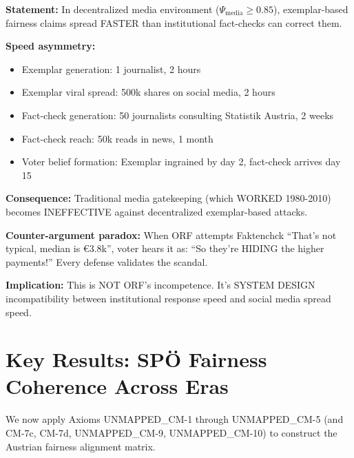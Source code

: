 \vspace{0.5em}

\begin{tcolorbox}[colback=gray!5!white, colframe=gray!75!black,
    title=Axiom UNMAPPED_CM-10: Institutional Lag and Media Gatekeeping Collapse]

\textbf{Statement:} In decentralized media environment ($\Psi_{\text{media}} \geq 0.85$),
exemplar-based fairness claims spread FASTER than institutional fact-checks can correct them.

\textbf{Speed asymmetry:}
\begin{itemize}[nosep]
\item Exemplar generation: 1 journalist, 2 hours
\item Exemplar viral spread: 500k shares on social media, 2 hours
\item Fact-check generation: 50 journalists consulting Statistik Austria, 2 weeks
\item Fact-check reach: 50k reads in news, 1 month
\item Voter belief formation: Exemplar ingrained by day 2, fact-check arrives day 15
\end{itemize}

\textbf{Consequence:} Traditional media gatekeeping (which WORKED 1980-2010) becomes
INEFFECTIVE against decentralized exemplar-based attacks.

\textbf{Counter-argument paradox:} When ORF attempts Faktenchck ``That's not typical,
median is €3.8k'', voter hears it as: ``So they're HIDING the higher payments!''
Every defense validates the scandal.

\textbf{Implication:} This is NOT ORF's incompetence. It's SYSTEM DESIGN incompatibility
between institutional response speed and social media spread speed.

\end{tcolorbox}

\section{Key Results: SPÖ Fairness Coherence Across Eras}
\label{sec:cm-results}

We now apply Axioms UNMAPPED_CM-1 through UNMAPPED_CM-5 (and CM-7c, CM-7d, UNMAPPED_CM-9, UNMAPPED_CM-10) to construct the Austrian fairness alignment matrix.

